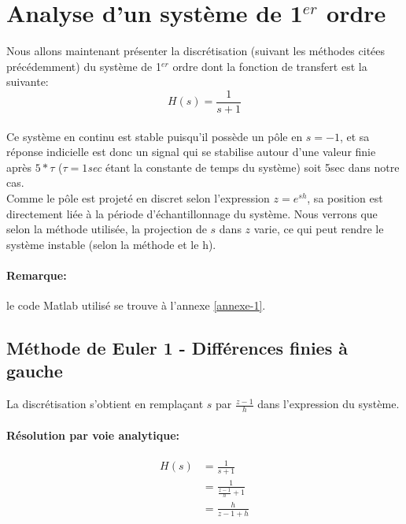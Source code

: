 \newpage
\section{Analyse d'un système de 1$^{er}$ ordre}
Nous allons maintenant présenter la discrétisation (suivant les méthodes citées précédemment) du système de 1$^{er}$ ordre dont la fonction de transfert est la suivante: 
\begin{equation*}
H(s)=\frac{1}{s+1}
\end{equation*}

\paragraph{}
Ce système en continu est stable puisqu'il possède un pôle en $s=-1$, et sa réponse indicielle est donc un signal qui se stabilise autour d'une valeur finie après $5*\tau$ ($\tau=1$\textit{sec} étant la constante de temps du système) soit 5sec dans notre cas. \\
Comme le pôle est projeté en discret selon l'expression $z=e^{sh}$, sa position est directement liée à la période d'échantillonnage du système. Nous verrons que selon la méthode utilisée, la projection de $s$ dans $z$ varie, ce qui peut rendre le système instable (selon la méthode et le h).

\paragraph{Remarque: } le code Matlab utilisé se trouve à l'annexe \ref{annexe-1}.

\subsection{Méthode de Euler 1 - Différences finies à gauche}

La discrétisation s'obtient en remplaçant $s$ par $\frac{z-1}{h}$ dans l'expression du système.

\paragraph{Résolution par voie analytique:}
\begin{equation}
\begin{split}
H(s) & = \frac{1}{s+1} \\
	& = \frac{1}{\frac{z-1}{h}+1} \\
	& = \frac{h}{z-1+h}
\end{split}
\end{equation}


